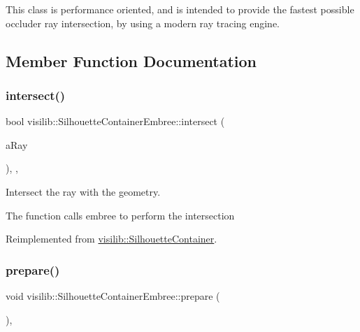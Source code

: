 This class is performance oriented, and is intended to provide the fastest possible occluder ray intersection, by using a modern ray tracing engine. 

\subsection{Member Function Documentation}
\mbox{\label{classvisilib_1_1_silhouette_container_embree_a3cc23503bfa6f2db55762cf0851d6c69}} 
\subsubsection{\texorpdfstring{intersect()}{intersect()}}
{\footnotesize\ttfamily bool visilib\+::\+Silhouette\+Container\+Embree\+::intersect (\begin{DoxyParamCaption}\item[{\mbox{\hyperlink{structvisilib_1_1_visibility_ray}{Visibility\+Ray}} $\ast$}]{a\+Ray }\end{DoxyParamCaption})\hspace{0.3cm}{\ttfamily [inline]}, {\ttfamily [override]}, {\ttfamily [virtual]}}



Intersect the ray with the geometry. 

The function calls embree to perform the intersection 

Reimplemented from \mbox{\hyperlink{classvisilib_1_1_silhouette_container}{visilib\+::\+Silhouette\+Container}}.

\mbox{\label{classvisilib_1_1_silhouette_container_embree_ad3d6193f5484b3fb56096efd8a1230a8}} 
\subsubsection{\texorpdfstring{prepare()}{prepare()}}
{\footnotesize\ttfamily void visilib\+::\+Silhouette\+Container\+Embree\+::prepare (\begin{DoxyParamCaption}{ }\end{DoxyParamCaption})\hspace{0.3cm}{\ttfamily [inline]}, {\ttfamily [virtual]}}



